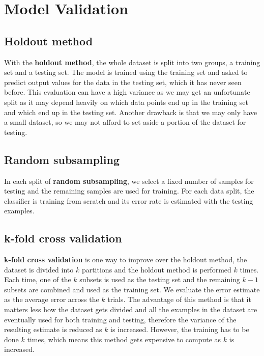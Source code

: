 \documentclass[11pt,fleqn]{book} %
\begin{document}
\section{Model Validation}
\subsection{Holdout method}
With the \textbf{holdout method}, the whole dataset is split into two groups, a training set and a testing set. The model is trained using the training set and asked to predict output values for the data in the testing set, which it has never seen before. This evaluation can have a high variance as we may get an unfortunate split as it may depend heavily on which data points end up in the training set and which end up in the testing set. Another drawback is that we may only have a small dataset, so we may not afford to set aside a portion of the dataset for testing.

\subsection{Random subsampling}
In each split of \textbf{random subsampling}, we select a fixed number of samples for testing and the remaining samples are used for training. For each data split, the classifier is training from scratch and its error rate is estimated with the testing examples.

\subsection{k-fold cross validation}
\textbf{k-fold cross validation} is one way to improve over the holdout method, the dataset is divided into $k$ partitions and the holdout method is performed $k$ times. Each time, one of the $k$ subsets is used as the testing set and the remaining $k - 1$ subsets are combined and used as the training set. We evaluate the error estimate as the average error across the $k$ trials. The advantage of this method is that it matters less how the dataset gets divided and all the examples in the dataset are eventually used for both training and testing, therefore the variance of the resulting estimate is reduced as $k$ is increased. However, the training has to be done $k$ times, which means this method gets expensive to compute as $k$ is increased.
\end{document}
